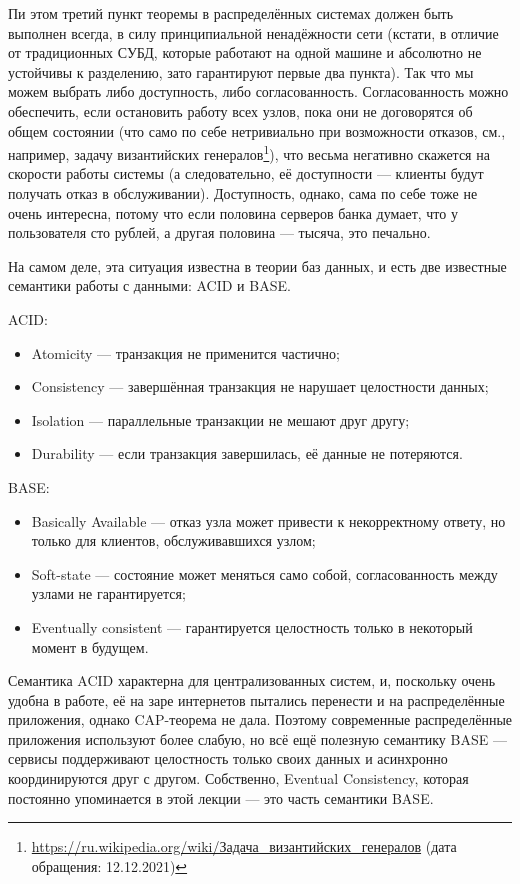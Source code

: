 \documentclass{../../text-style}
\begin{document}
Пи этом третий пункт теоремы в распределённых системах должен быть выполнен всегда, в силу принципиальной ненадёжности сети (кстати, в отличие от традиционных СУБД, которые работают на одной машине и абсолютно не устойчивы к разделению, зато гарантируют первые два пункта). Так что мы можем выбрать либо доступность, либо согласованность. Согласованность можно обеспечить, если остановить работу всех узлов, пока они не договорятся об общем состоянии (что само по себе нетривиально при возможности отказов, см., например, задачу византийских генералов\footnote{\url{https://ru.wikipedia.org/wiki/Задача_византийских_генералов} (дата обращения: 12.12.2021)}), что весьма негативно скажется на скорости работы системы (а следовательно, её доступности --- клиенты будут получать отказ в обслуживании). Доступность, однако, сама по себе тоже не очень интересна, потому что если половина серверов банка думает, что у пользователя сто рублей, а другая половина --- тысяча, это печально.

На самом деле, эта ситуация известна в теории баз данных, и есть две известные семантики работы с данными: ACID и BASE.

ACID:
\begin{itemize}
    \item Atomicity --- транзакция не применится частично;
    \item Consistency --- завершённая транзакция не нарушает целостности данных;
    \item Isolation --- параллельные транзакции не мешают друг другу;
    \item Durability --- если транзакция завершилась, её данные не потеряются.
\end{itemize}

BASE:
\begin{itemize}
    \item Basically Available --- отказ узла может привести к некорректному ответу, но только для клиентов, обслуживавшихся узлом;
    \item Soft-state --- состояние может меняться само собой, согласованность между узлами не гарантируется;
    \item Eventually consistent --- гарантируется целостность только в некоторый момент в будущем.
\end{itemize}

Семантика ACID характерна для централизованных систем, и, поскольку очень удобна в работе, её на заре интернетов пытались перенести и на распределённые приложения, однако CAP-теорема не дала. Поэтому современные распределённые приложения используют более слабую, но всё ещё полезную семантику BASE --- сервисы поддерживают целостность только своих данных и асинхронно координируются друг с другом. Собственно, Eventual Consistency, которая постоянно упоминается в этой лекции --- это часть семантики BASE.
\end{document}
